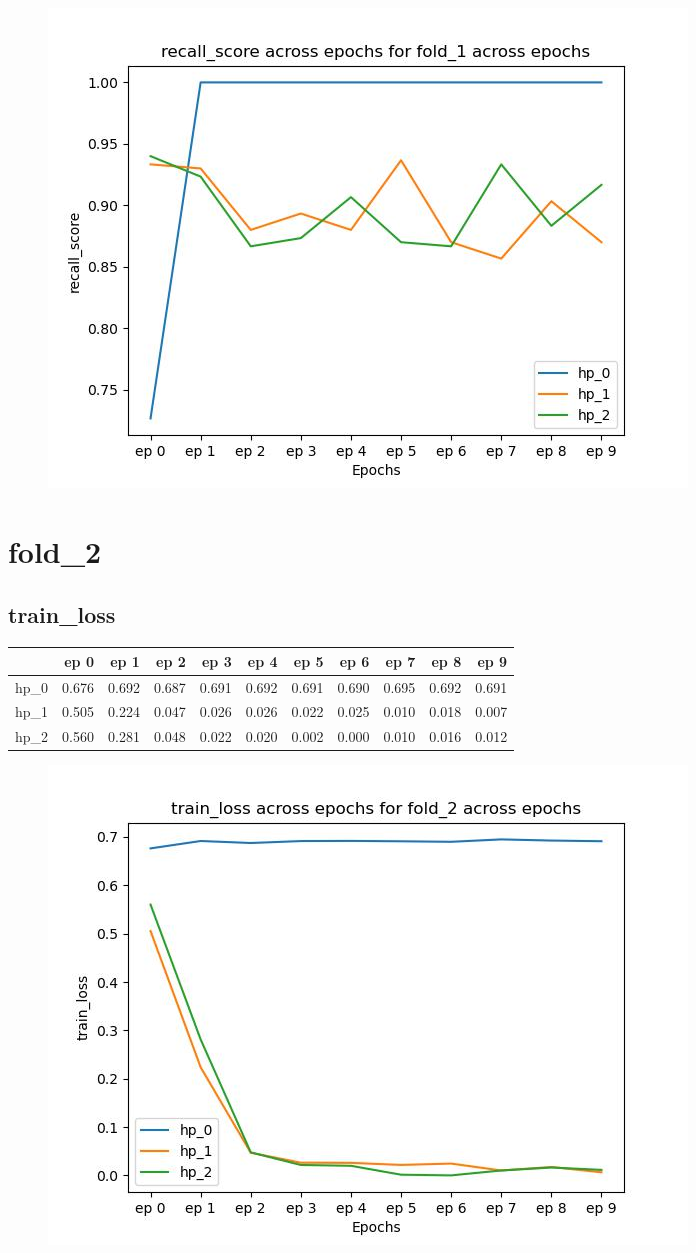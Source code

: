 \documentclass{article}
\begin{document}
\begin{figure}[H]
\includegraphics[scale = 0.75]{fold_1/recall_score}
\end{figure}
\section{fold\_2}
\subsection{train\_loss}
\begin{tabular}{lrrrrrrrrrr}
\toprule
{} &   ep 0 &   ep 1 &   ep 2 &   ep 3 &   ep 4 &   ep 5 &   ep 6 &   ep 7 &   ep 8 &   ep 9 \\
\midrule
hp\_0 &  0.676 &  0.692 &  0.687 &  0.691 &  0.692 &  0.691 &  0.690 &  0.695 &  0.692 &  0.691 \\
hp\_1 &  0.505 &  0.224 &  0.047 &  0.026 &  0.026 &  0.022 &  0.025 &  0.010 &  0.018 &  0.007 \\
hp\_2 &  0.560 &  0.281 &  0.048 &  0.022 &  0.020 &  0.002 &  0.000 &  0.010 &  0.016 &  0.012 \\
\bottomrule
\end{tabular}

\begin{figure}[H]
\includegraphics[scale = 0.75]{fold_2/train_loss}
\end{figure}
\end{document}
